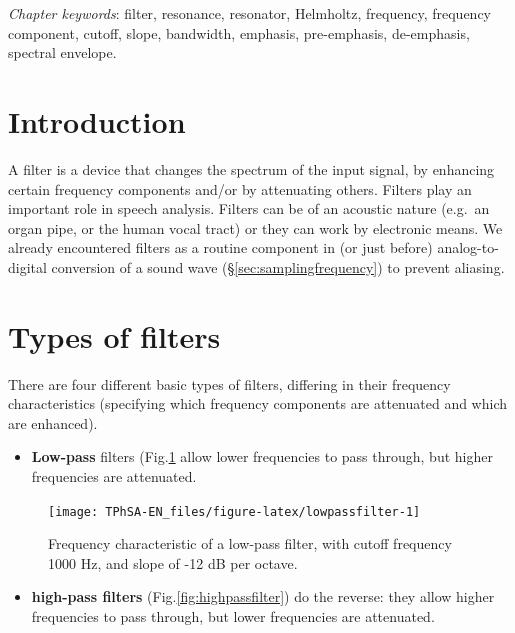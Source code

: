 \documentclass[
]{book}
\providecommand{\tightlist}{%
  \setlength{\itemsep}{0pt}\setlength{\parskip}{0pt}}
\begin{document}
\emph{Chapter keywords}: filter, resonance, resonator, Helmholtz, frequency, frequency component, cutoff, slope, bandwidth, emphasis, pre-emphasis, de-emphasis, spectral envelope.

\section{Introduction}\label{introduction}

A filter is a device that changes the spectrum of the input signal, by enhancing certain frequency components and/or by attenuating others. Filters play an important role in speech analysis. Filters can be of an acoustic nature (e.g.~an organ pipe, or the human vocal tract) or they can work by electronic means. We already encountered filters as a routine component in (or just before) analog-to-digital conversion of a sound wave (§\ref{sec:samplingfrequency}) to prevent aliasing.

\section{Types of filters}\label{sec:typesoffilters}

There are four different basic types of filters, differing in their frequency characteristics (specifying which frequency components are attenuated and which are enhanced).

\begin{itemize}
\tightlist
\item
  \textbf{Low-pass} filters (Fig.\ref{fig:lowpassfilter} allow lower frequencies to pass through, but higher frequencies are attenuated.
\end{itemize}

\begin{figure}

{\centering \texttt{[image: TPhSA-EN\_files/figure-latex/lowpassfilter-1]} 

}

\caption{Frequency characteristic of a low-pass filter, with cutoff frequency 1000 Hz, and slope of -12 dB per octave.}\label{fig:lowpassfilter}
\end{figure}

\begin{itemize}
\tightlist
\item
  \textbf{high-pass filters} (Fig.\ref{fig:highpassfilter}) do the reverse: they allow higher frequencies to pass through, but lower frequencies are attenuated.
\end{itemize}
\end{document}
